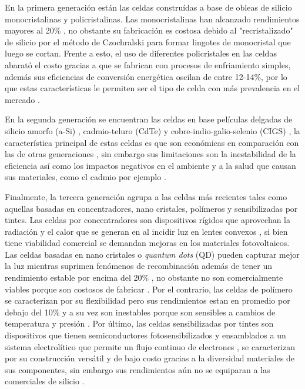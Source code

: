 En la primera generación están las celdas construídas a base de obleas de silicio monocristalinas y policristalinas. Las monocristalinas han alcanzado rendimientos mayores al 20\% \cite{gul2016}, no obstante su fabricación es costosa  \cite{srinivas2015review} debido al "recristalizado" de silicio por el método de Czochralski \cite{yu2019growth} para formar lingotes de monocristal que luego se cortan. Frente a esto, el uso de diferentes policristales en las celdas abarató el costo gracias a que se fabrican con procesos de enfriamiento simples, además sus eficiencias de conversión energética oscilan de entre 12-14\%, por lo que estas características le permiten ser el tipo de celda con más prevalencia en el mercado \cite{sharma2015solar}. 

En la segunda generación se encuentran las celdas en base películas delgadas de silicio amorfo (a-Si) \cite{kaur2016review}, cadmio-teluro (CdTe) \cite{bertolli2008} y cobre-indio-galio-selenio (CIGS) \cite{bagher2015types}, la característica principal de estas celdas es que son económicas en comparación con las de otras generaciones \cite{rathore2021}, sin embargo sus limitaciones son la inestabilidad de la eficiencia \cite{gul2016review} así como los impactos negativos en el ambiente y a la salud que causan sus materiales, como el cadmio por ejemplo \cite{bagher2015types}. 

Finalmente, la tercera generación agrupa a las celdas más recientes tales como aquellas basadas en concentradores, nano cristales, polímeros y sensibilizadas por tintes. Las celdas por concentradores son dispositivos rígidos que aprovechan la radiación y el calor que se generan en al incidir luz en lentes convexos \cite{bertolli2008}, si bien tiene viabilidad comercial se demandan mejoras en los materiales fotovoltaicos. Las celdas basadas en nano cristales o \textit{quantum dots} (QD) pueden capturar mejor la luz mientras suprimen fenómenos de recombinación además de tener un rendimiento estable por encima del 20\% \cite{kim2022conformal}, no obstante no son comercialmente viables porque son costosos de fabricar \cite{jean2018synthesis}. Por el contrario, las celdas de polímero se caracterizan por su flexibilidad pero sus rendimientos estan en promedio por debajo del 10\% y a su vez son inestables porque son sensibles a cambios de temperatura y presión \cite{gusain2019polymer}. Por último, las celdas sensibilizadas por tintes son dispositivos que tienen semiconductores fotosensibilizados y ensamblados a un sistema electrolítico que permite un flujo continuo de electrones \cite{suhaimi2015materials}, se caracterizan por su construcción versátil y de bajo costo gracias a la diversidad materiales de sus componentes, sin embargo sus rendimientos aún no se equiparan a las comerciales de silicio \cite{sharma2018dye}. 


